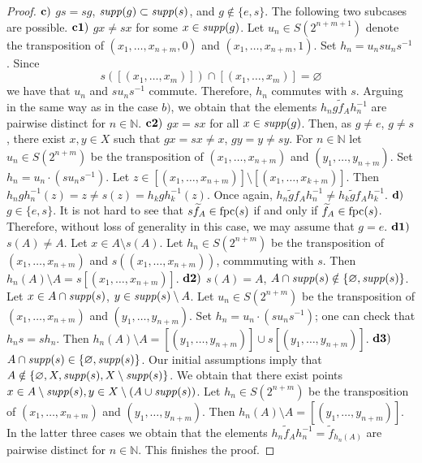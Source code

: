 \documentclass[11pt]{amsart}
\newcommand{\suppg}{{\it supp}}
\newcommand{\fpc}{{\rm fpc}}
\theoremstyle{plain}
\theoremstyle{definition}
\theoremstyle{remark}
\numberwithin{equation}{section}
\begin{document}
\begin{proof}
	\vskip 0.1cm\noindent
	${\bf c)}$ $gs=sg$, $\suppg(g)\subset\suppg(s)$, and $g\notin \{e,s\}$. The following two subcases are possible. 
	\vskip 0.1cm\noindent 
	${\bf c1)}$ $gx\neq sx$ for some $x\in\suppg(g)$. Let $u_n\in S(2^{n+m+1})$ denote the transposition of $(x_1,\ldots,x_{n+m},0)$ and $(x_1,\ldots,x_{n+m},1)$. Set $h_n=u_nsu_ns^{-1}$. Since $$s([(x_1,\ldots,x_m)])\cap [(x_1,\ldots,x_m)]=\varnothing$$ we have that $u_n$ and $su_ns^{-1}$ commute. Therefore, $h_n$ commutes with $s$. Arguing in the same way as in the case $b)$, we obtain that the elements $h_n g\widetilde f_Ah_n^{-1}$ are pairwise distinct for $n\in\mathbb N$.
	\vskip 0.1cm\noindent 
	${\bf c2)}$  $gx=sx$ for all $x\in\suppg(g)$. Then, as $g \neq e$, $g \neq s$, there  exist $x,y\in X$ such that $gx=sx\neq x$, $gy=y\neq sy$. For $n\in\mathbb N$ let $u_n\in S(2^{n+m})$ be the transposition of $(x_1,\ldots,x_{n+m})$ and $(y_1,\ldots,y_{n+m})$. Set $h_n=u_n\cdot (su_ns^{-1})$. Let $z\in [(x_1,\ldots,x_{n+m})]\setminus [(x_1,\ldots,x_{k+m})]$. Then $h_ngh_n^{-1}(z)=z\neq s(z)=h_kgh_k^{-1}(z)$. Once again, $h_n\widetilde gf_Ah_n^{-1}\neq h_k\widetilde  gf_Ah_k^{-1}$.\vskip 0.1cm\noindent
	${\bf d)}$ $g\in \{e,s\}$. It is not hard to see that $s\widetilde f_A\in \fpc(s)$ if and only if $\widetilde f_A\in \fpc(s)$. Therefore, without loss of generality in this case, we may assume that $g=e$. 
	\vskip 0.1cm\noindent 
	${\bf d1)}$ $s(A)\neq A$. Let $x\in A\setminus s(A)$. Let $h_n\in S(2^{n+m})$ be the transposition of $(x_1,\ldots,x_{n+m})$ and $s((x_1,\ldots,x_{n+m}))$, commmuting with $s$. Then $h_n(A)\setminus A=s[(x_1,\ldots,x_{n+m})]$.
	\vskip 0.1cm\noindent 
	${\bf d2)}$  $s(A)=A$, $A\cap\suppg(s)\notin\{\varnothing,\suppg(s)\}$. Let $x\in A\cap \suppg(s)$, $y\in \suppg(s)\setminus A$.  Let $u_n\in S(2^{n+m})$ be the transposition of $(x_1,\ldots,x_{n+m})$ and $(y_1,\ldots,y_{n+m})$. Set $h_n=u_n\cdot (s u_ns^{-1})$; one can check that $h_n s = sh_n$. Then $h_n(A)\setminus A=[(y_1,\ldots,y_{n+m})]\cup s[(y_1,\ldots,y_{n+m})]$. 
	\vskip 0.1cm\noindent
	${\bf d3)}$ $A\cap \suppg(s)\in \{\varnothing,\suppg(s)\}$. Our initial assumptions imply that $A\notin\{\varnothing,X,\suppg(s),X\setminus\suppg(s)\}$. We obtain that there exist points $x\in A\setminus\suppg(s),y\in X\setminus (A\cup \suppg(s))$. Let $h_n\in S(2^{n+m})$ be the transposition of $(x_1,\ldots,x_{n+m})$ and $(y_1,\ldots,y_{n+m})$. Then $h_n(A)\setminus A=[(y_1,\ldots,y_{n+m})]$.
	\vskip 0.1cm\noindent
	In the latter three cases we obtain that the elements $h_n\widetilde f_A h_n^{-1}=\widetilde f_{h_n(A)}$ are pairwise distinct for $n\in\mathbb N$. This finishes the proof. 
\end{proof}
\end{document}
